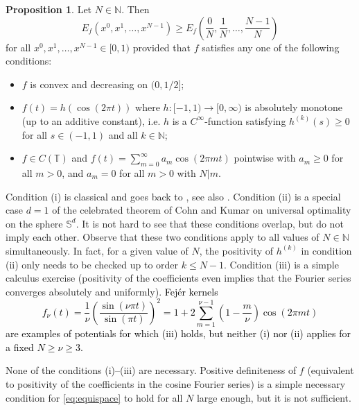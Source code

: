 \documentclass[a4paper,12pt]{article}
\numberwithin{equation}{section}
\theoremstyle{definition}
\newtheorem{prop}[thm]{Proposition}
\newcommand{\bbN}{\mathbb{N}}
\begin{document}
\begin{prop} \label{prop:equispaced} 
Let $N \in \bbN$. Then
\begin{equation}\label{eq:equispace}
E_f(x^0, x^1, \dots, x^{N-1}) \geq E_f\left(\frac0N, \frac1N, \dots, \frac{N-1}N\right)
\end{equation}
for all $x^0, x^1, \dots, x^{N-1} \in [0, 1)$   %
provided that $f$ satisfies  any one of the following conditions:
\begin{itemize}
    \item [(i)] $f$ is convex and decreasing on $(0, 1/2]$;

    \item [(ii)] $f(t) = h(\cos(2\pi t))$ where $h: [-1, 1) \rightarrow [0, \infty)$  %
     is absolutely monotone (up to an additive constant), i.e. $h$ is  a $C^\infty$-function satisfying  $h^{(k)}(s) \geq 0$ for all $s \in (-1, 1)$ and all $k \in \bbN$; 

    \item [(iii)]  $f\in C (\mathbb T)$ and $f(t) = \sum_{m=0}^\infty a_m \cos(2\pi mt)$ pointwise with  $a_m \geq 0$ for all $m > 0$, and $a_m = 0$ for all $m > 0$ with $N | m$.
\end{itemize}
\end{prop}


Condition (i) is classical and goes back to \cite{Fej56}, see also \cite{BHS12}. Condition (ii) is a special case $d=1$ of the celebrated theorem of Cohn and Kumar \cite{CK07} on universal optimality on the sphere $\mathbb S^d$.  It is not hard to see that these conditions overlap, but do not imply each other. Observe that these two conditions apply to all values of $N \in \mathbb N$ simultaneously. In fact, for a given value of $N$,  the positivity of $h^{(k)}$ in condition (ii) only needs to be checked up to order $k \leq N-1$. Condition (iii) is a simple calculus exercise (positivity of the coefficients even implies that the Fourier series converges absolutely and uniformly). \textcolor{black}{Fejér kernels
$$
f^{}_\nu(t) = \frac1\nu \left(\frac{\sin(\nu\pi t)}{\sin(\pi t)}\right)^2 = 1 + 2 \sum_{m = 1}^{\nu-1} \left(1-\frac m\nu\right) \cos(2\pi mt)
$$
are examples of potentials for which (iii) holds, but neither (i) nor (ii) applies for a fixed $N \geq \nu \geq3$.} 

None of the conditions (i)--(iii) are  necessary.  Positive definiteness of $f$ (equivalent to positivity of the coefficients in the cosine Fourier series) is a simple necessary condition for \eqref{eq:equispace} to hold  for all $N$ large enough,  %
but it is not sufficient.%
\end{document}
